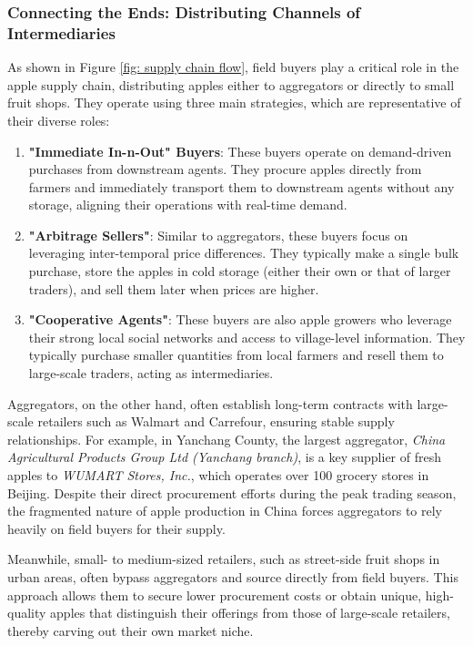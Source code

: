 \subsubsection{Connecting the Ends: Distributing Channels of Intermediaries}
As shown in Figure \ref{fig: supply chain flow}, field buyers play a critical role in the apple supply chain, distributing apples either to aggregators or directly to small fruit shops. They operate using three main strategies, which are representative of their diverse roles:

\begin{enumerate}
    \item \textbf{"Immediate In-n-Out" Buyers}: These buyers operate on demand-driven purchases from downstream agents. They procure apples directly from farmers and immediately transport them to downstream agents without any storage, aligning their operations with real-time demand.

    \item \textbf{"Arbitrage Sellers"}: Similar to aggregators, these buyers focus on leveraging inter-temporal price differences. They typically make a single bulk purchase, store the apples in cold storage (either their own or that of larger traders), and sell them later when prices are higher.

    \item \textbf{"Cooperative Agents"}: These buyers are also apple growers who leverage their strong local social networks and access to village-level information. They typically purchase smaller quantities from local farmers and resell them to large-scale traders, acting as intermediaries.
\end{enumerate}

Aggregators, on the other hand, often establish long-term contracts with large-scale retailers such as Walmart and Carrefour, ensuring stable supply relationships. For example, in Yanchang County, the largest aggregator, \textit{China Agricultural Products Group Ltd (Yanchang branch)}, is a key supplier of fresh apples to \textit{WUMART Stores, Inc.}, which operates over 100 grocery stores in Beijing. Despite their direct procurement efforts during the peak trading season, the fragmented nature of apple production in China forces aggregators to rely heavily on field buyers for their supply.

Meanwhile, small- to medium-sized retailers, such as street-side fruit shops in urban areas, often bypass aggregators and source directly from field buyers. This approach allows them to secure lower procurement costs or obtain unique, high-quality apples that distinguish their offerings from those of large-scale retailers, thereby carving out their own market niche.

